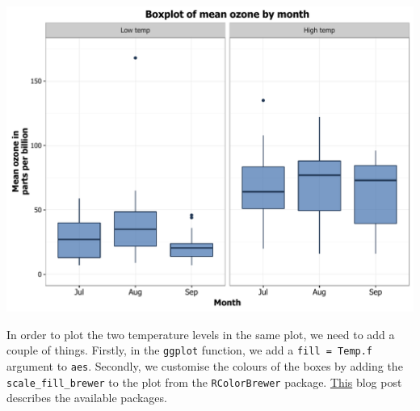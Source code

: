\begin{center}\includegraphics[width=0.55\linewidth]{figures/box_16-1} \end{center}

In order to plot the two temperature levels in the same plot, we need to
add a couple of things. Firstly, in the \texttt{ggplot} function, we add
a \texttt{fill\ =\ Temp.f} argument to \texttt{aes}. Secondly, we
customise the colours of the boxes by adding the
\texttt{scale\_fill\_brewer} to the plot from the \texttt{RColorBrewer}
package.
\href{http://moderndata.plot.ly/create-colorful-graphs-in-r-with-rcolorbrewer-and-plotly/}{This}
blog post describes the available packages.

